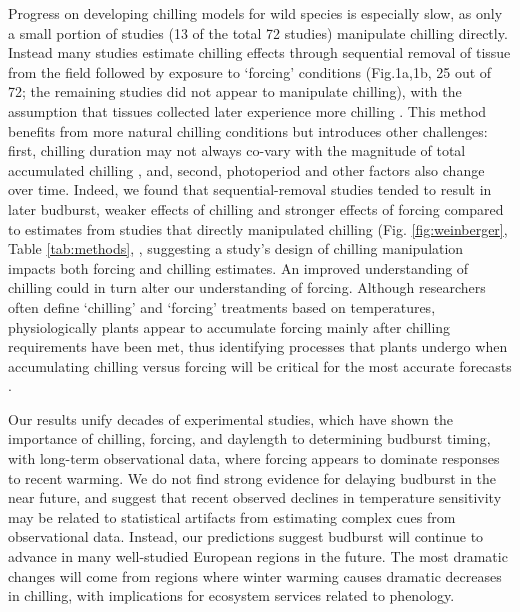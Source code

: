 \documentclass{article}
\begin{document}
\par Progress on developing chilling models for wild species is especially slow, as only a small portion of studies (13 of the total 72 studies) manipulate chilling directly. Instead many studies estimate chilling effects through sequential removal of tissue from the field followed by exposure to `forcing' conditions (Fig.1a,1b, 25 out of 72; the remaining studies did not appear to manipulate chilling), with the assumption that tissues collected later experience more chilling \emph{\citep{weinberger1950}}. This method benefits from more natural chilling conditions but introduces other challenges: first, chilling duration may not always co-vary with the magnitude of total accumulated chilling \emph{\citep{dennis2003}}, and, second, photoperiod and other factors also change over time. Indeed, we found that sequential-removal studies tended to result in later budburst, weaker effects of chilling and stronger effects of forcing compared to estimates from studies that directly manipulated chilling (Fig. \ref{fig:weinberger}, Table \ref{tab:methods}, \emph{\citep{weinberger1950,polgar2013}}, suggesting a study's design of chilling manipulation impacts both forcing and chilling estimates. An improved understanding of chilling could in turn alter our understanding of forcing. Although researchers often define `chilling' and `forcing' treatments based on temperatures, physiologically plants appear to accumulate forcing mainly after chilling requirements have been met, thus identifying processes that plants undergo when accumulating chilling versus forcing will be critical for the most accurate forecasts \emph{\citep{chuine2016}}.


 \par Our results unify decades of experimental studies, which have shown the importance of chilling, forcing, and daylength to determining budburst timing, with long-term observational data, where forcing appears to dominate responses to recent warming. We do not find strong evidence for delaying budburst in the near future, and suggest that recent observed declines in temperature sensitivity may be related to statistical artifacts from estimating complex cues from observational data. Instead, our predictions suggest budburst will continue to advance in many well-studied European regions in the future. The most dramatic changes will come from regions where winter warming causes dramatic decreases in chilling, with implications for ecosystem services related to phenology. %
 
\end{document}
